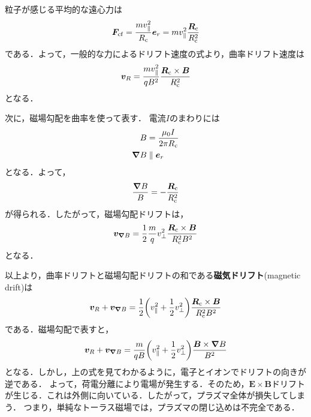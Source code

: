 \documentclass{report}
\begin{document}
          粒子が感じる平均的な遠心力は
          \begin{align}
            \bm{F}_{\mathrm{cf}} = \frac{m v_{\parallel}^2}{R_{\mathrm{c}}}\bm{e}_r = m v_{\parallel}^2 \frac{\bm{R}_{\mathrm{c}}}{R_{\mathrm{c}}^2}
          \end{align}
          である．よって，一般的な力によるドリフト速度の式より，曲率ドリフト速度は
          \begin{align}
            \bm{v}_R = \frac{mv_{\parallel}^2}{qB^2}\frac{\bm{R}_{\mathrm{c}} \times \bm{B}}{R_{\mathrm{c}}^2}
          \end{align}
          となる．

          次に，磁場勾配を曲率を使って表す．
          電流$I$のまわりには
          \begin{align}
            B &= \frac{\mu_0 I}{2\pi R_{\mathrm{c}}}\\
            \grad B &\parallel \bm{e}_r
          \end{align}
          となる．よって，
          \begin{align}
            \frac{\grad B}{B} = -\frac{\bm{R}_{\mathrm{c}}}{R_{\mathrm{c}}^2}
          \end{align}
          が得られる．したがって，磁場勾配ドリフトは，
          \begin{align}
            \bm{v}_{\grad B} = \frac{1}{2}\frac{m}{q}v_{\perp}^2 \frac{\bm{R}_{\mathrm{c}} \times \bm{B}}{R_{\mathrm{c}}^2 B^2}
          \end{align}
          となる．

          以上より，曲率ドリフトと磁場勾配ドリフトの和である\textbf{磁気ドリフト}(magnetic drift)は
          \begin{align}
            \bm{v}_{R} + \bm{v}_{\grad B} = \frac{1}{2}\qty(v_{\parallel}^2 + \frac{1}{2}v_{\perp}^2)\frac{\bm{R}_{\mathrm{c}} \times \bm{B}}{R_{\mathrm{c}}^2 B^2}
          \end{align}
          である．磁場勾配で表すと，
          \begin{align}
            \bm{v}_{R} + \bm{v}_{\grad B} =\frac{m}{qB}\qty(v_{\parallel}^2 + \frac{1}{2}v_{\perp}^2) \frac{\bm{B} \times \grad B}{B^2}
          \end{align}
          となる．しかし，上の式を見てわかるように，電子とイオンでドリフトの向きが逆である．
          よって，荷電分離により電場が発生する．そのため，$\bm{E}\times\bm{B}$ドリフトが生じる．これは外側に向いている．したがって，プラズマ全体が損失してしまう．
          つまり，単純なトーラス磁場では，プラズマの閉じ込めは不完全である．
\end{document}
